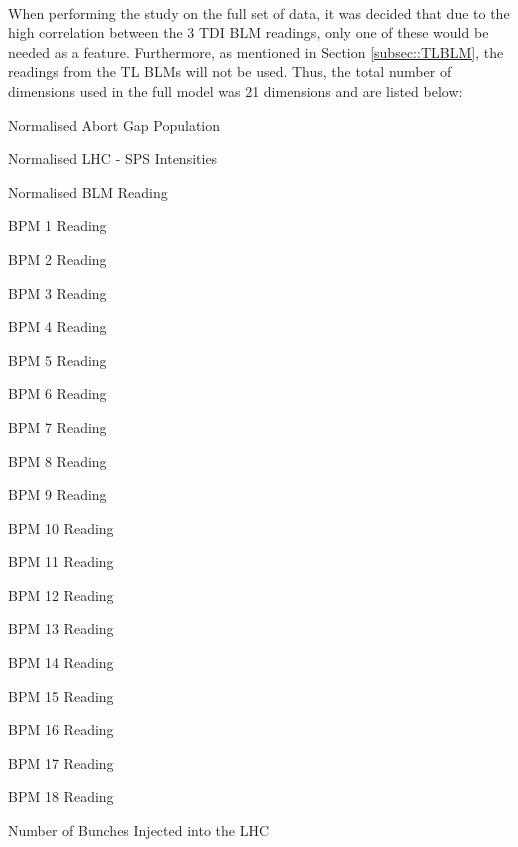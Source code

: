 \paragraph{ }When performing the study on the full set of data, it was decided that due to the high correlation between the 3 \acs{TDI} \acs{BLM} readings, only one of these would be needed as a feature. Furthermore, as mentioned in Section \ref{subsec::TLBLM}, the readings from the \acs{TL} \acs{BLM}s will not be used. Thus, the total number of dimensions used in the full model was 21 dimensions and are listed below:

\begin{enumerate}
	\begin{minipage}[t]{0.475\linewidth}
		\item Normalised Abort Gap Population
		\item Normalised \acs{LHC} - \acs{SPS} Intensities
		\item Normalised \acs{BLM} Reading
		\item \acs{BPM} 1 Reading
		\item \acs{BPM} 2 Reading
		\item \acs{BPM} 3 Reading
		\item \acs{BPM} 4 Reading
		\item \acs{BPM} 5 Reading
		\item \acs{BPM} 6 Reading
		\item \acs{BPM} 7 Reading
		\item \acs{BPM} 8 Reading
	\end{minipage}	
	\hspace{0.25cm}
	\begin{minipage}[t]{0.475\linewidth}
		\item \acs{BPM} 9 Reading
		\item \acs{BPM} 10 Reading
		\item \acs{BPM} 11 Reading
		\item \acs{BPM} 12 Reading
		\item \acs{BPM} 13 Reading
		\item \acs{BPM} 14 Reading
		\item \acs{BPM} 15 Reading
		\item \acs{BPM} 16 Reading
		\item \acs{BPM} 17 Reading
		\item \acs{BPM} 18 Reading
		\item Number of Bunches Injected into the \acs{LHC}
	\end{minipage}	
\end{enumerate}

